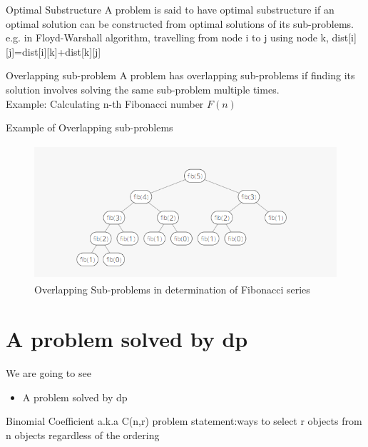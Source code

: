 \documentclass{beamer}
\begin{document}
\begin{frame}{Optimal Substructure}
    A problem is said to have optimal substructure if an optimal
solution can be constructed from optimal solutions of its
sub-problems.\\
e.g. in {\color{blue}Floyd-Warshall} algorithm, travelling from node i to j using node k, dist[i][j]=dist[i][k]+dist[k][j]
\end{frame}

\begin{frame}{Overlapping sub-problem}
    A problem has overlapping sub-problems if finding its solution
involves solving the same sub-problem multiple times.\\
Example: Calculating n-th Fibonacci number $F (n)$
\end{frame}
\begin{frame}{Example of Overlapping sub-problems}
    \begin{figure}
        \centering
        \includegraphics[height=5cm]{fib.png}
        \caption{Overlapping Sub-problems in determination of Fibonacci series}
        \label{fig:my_label}
    \end{figure}
\end{frame}

\section{A problem solved by dp}
\begin{frame}{We are going to see}
    \begin{itemize}
    \item A problem solved by dp 
    \end{itemize}
\end{frame}
\begin{frame}{Binomial Coefficient a.k.a C(n,r)}
    problem statement:{\color{red}ways to select}  r objects from n objects
regardless of the ordering
\end{frame}
\end{document}
